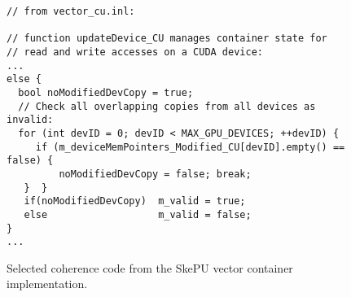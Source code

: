 \begin{figure}
\begin{small}
\begin{verbatim}
// from vector_cu.inl:

// function updateDevice_CU manages container state for
// read and write accesses on a CUDA device:
...
else {
  bool noModifiedDevCopy = true;
  // Check all overlapping copies from all devices as invalid:
  for (int devID = 0; devID < MAX_GPU_DEVICES; ++devID) {
     if (m_deviceMemPointers_Modified_CU[devID].empty() == false) {
         noModifiedDevCopy = false; break;
   }  }
   if(noModifiedDevCopy)  m_valid = true;
   else                   m_valid = false;
}
...
\end{verbatim}
\end{small}

\vspace*{-3mm}
\caption{\label{fig:skepucoherence2}Selected coherence code from the SkePU vector container implementation.}
\end{figure}
  
